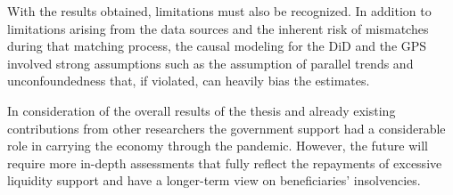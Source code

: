 With the results obtained, limitations must also be recognized. In addition to limitations arising from the data sources and the inherent risk of mismatches during that matching process, the causal modeling for the DiD and the GPS involved strong assumptions such as the assumption of parallel trends and unconfoundedness that, if violated, can heavily bias the estimates.
 
In consideration of the overall results of the thesis and already existing contributions from other researchers the government support had a considerable role in carrying the economy through the pandemic. However, the future will require more in-depth assessments that fully reflect the repayments of excessive liquidity support and have a longer-term view on beneficiaries' insolvencies.

